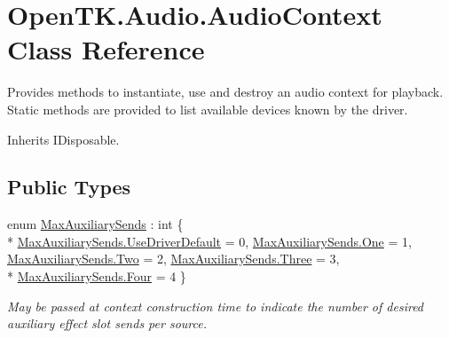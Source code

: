 \hypertarget{class_open_t_k_1_1_audio_1_1_audio_context}{\section{Open\-T\-K.\-Audio.\-Audio\-Context Class Reference}
\label{class_open_t_k_1_1_audio_1_1_audio_context}
}


Provides methods to instantiate, use and destroy an audio context for playback. Static methods are provided to list available devices known by the driver.  




Inherits I\-Disposable.

\subsection*{Public Types}
\begin{DoxyCompactItemize}
\item 
enum \hyperlink{class_open_t_k_1_1_audio_1_1_audio_context_a97c79a9ffc0910a0b644856cf82afdd8}{Max\-Auxiliary\-Sends} \-: int \{ \\*
\hyperlink{class_open_t_k_1_1_audio_1_1_audio_context_a97c79a9ffc0910a0b644856cf82afdd8a9a2bd99ca94c5dfe66d8b3ae993e896c}{Max\-Auxiliary\-Sends.\-Use\-Driver\-Default} = 0, 
\hyperlink{class_open_t_k_1_1_audio_1_1_audio_context_a97c79a9ffc0910a0b644856cf82afdd8a06c2cea18679d64399783748fa367bdd}{Max\-Auxiliary\-Sends.\-One} = 1, 
\hyperlink{class_open_t_k_1_1_audio_1_1_audio_context_a97c79a9ffc0910a0b644856cf82afdd8aaada29daee1d64ed0fe907043855cb7e}{Max\-Auxiliary\-Sends.\-Two} = 2, 
\hyperlink{class_open_t_k_1_1_audio_1_1_audio_context_a97c79a9ffc0910a0b644856cf82afdd8aca8a2087e5557e317599344687a57391}{Max\-Auxiliary\-Sends.\-Three} = 3, 
\\*
\hyperlink{class_open_t_k_1_1_audio_1_1_audio_context_a97c79a9ffc0910a0b644856cf82afdd8a981b8fcee42e1e726a67a2b9a98ea6e9}{Max\-Auxiliary\-Sends.\-Four} = 4
 \}
\begin{DoxyCompactList}\small\item\em May be passed at context construction time to indicate the number of desired auxiliary effect slot sends per source.\end{DoxyCompactList}\end{DoxyCompactItemize}
